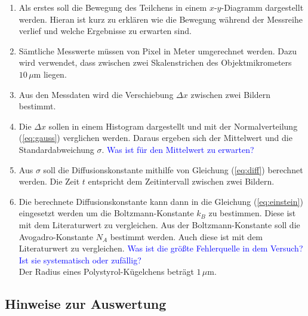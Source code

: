 \begin{enumerate}

  \item Als erstes soll die Bewegung des Teilchens in einem $x$-$y$-Diagramm dargestellt werden. Hieran ist kurz zu erklären wie die Bewegung während der Messreihe verlief und welche Ergebnisse zu erwarten sind.

  \item Sämtliche Messwerte müssen von Pixel in Meter umgerechnet werden. Dazu wird verwendet, dass zwischen zwei Skalenstrichen des Objektmikrometers $10\, \mu$m liegen.

  \item Aus den Messdaten wird die Verschiebung $\Delta x$ zwischen zwei Bildern bestimmt.

  \item Die $\Delta x$ sollen in einem Histogram dargestellt und mit der Normalverteilung (\ref{eq:gauss}) verglichen werden. Daraus ergeben sich der Mittelwert und die Standardabweichung $\sigma$. \textcolor{blue}{Was ist für den Mittelwert zu erwarten?}

  \item Aus $\sigma$ soll die Diffusionskonstante mithilfe von Gleichung (\ref{eq:diff}) berechnet werden. Die Zeit $t$ entspricht dem Zeitintervall zwischen zwei Bildern.

  \item Die berechnete Diffusionskonstante kann dann in die Gleichung (\ref{eq:einstein}) eingesetzt werden um die Boltzmann-Konstante $k_B$ zu bestimmen. Diese ist mit dem Literaturwert zu vergleichen. Aus der Boltzmann-Konstante soll die Avogadro-Konstante $N_A$ bestimmt werden. Auch diese ist mit dem Literaturwert zu vergleichen. \textcolor{blue}{Was ist die größte Fehlerquelle in dem Versuch? Ist sie systematisch oder zufällig?}\\
  Der Radius eines Polystyrol-Kügelchens beträgt $1\,\mu$m.

\end{enumerate}


\subsection*{Hinweise zur Auswertung}


